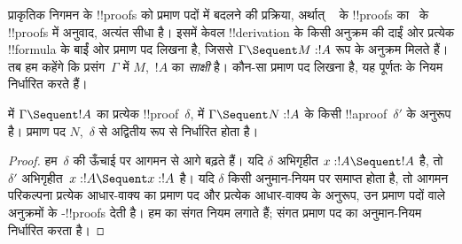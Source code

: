 \documentclass[../../../include/open-logic-section]{subfiles}
\begin{document}


प्राकृतिक निगमन के !!{proof}s को प्रमाण पदों में बदलने की प्रक्रिया, अर्थात्
~ के !!{proof}s का~ के !!{proof}s में अनुवाद, अत्यंत सीधा
है। इसमें केवल !!{derivation} के किसी अनुक्रम की दाईं ओर प्रत्येक !!{formula}
के बाईं ओर प्रमाण पद लिखना है, जिससे $\Gamma \Sequent M : !A$ रूप के अनुक्रम
मिलते हैं। तब हम कहेंगे कि प्रसंग~$\Gamma$ में $M$,~$!A$ का \emph{साक्षी} है।
कौन-सा प्रमाण पद लिखना है, यह पूर्णतः  के नियम निर्धारित करते हैं।

\begin{prop}
 में $\Gamma \Sequent !A$ का प्रत्येक !!{proof}~$\delta$,
 में $\Gamma \Sequent N : !A$ के किसी !!a{proof}~$\delta'$ के अनुरूप
है। प्रमाण पद $N$,~$\delta$ से अद्वितीय रूप से निर्धारित होता है।
\end{prop}

\begin{proof}
हम~$\delta$ की ऊँचाई पर आगमन से आगे बढ़ते हैं। यदि $\delta$ अभिगृहीत $x:!A
\Sequent !A$ है, तो $\delta'$ अभिगृहीत~$x:!A \Sequent x:!A$ है। यदि $\delta$
किसी अनुमान-नियम पर समाप्त होता है, तो आगमन परिकल्पना प्रत्येक आधार-वाक्य का
प्रमाण पद और प्रत्येक आधार-वाक्य के अनुरूप, उन प्रमाण पदों वाले अनुक्रमों के
-!!{proof}s देती है। हम  का संगत नियम लगाते हैं; संगत
प्रमाण पद  का अनुमान-नियम निर्धारित करता है।
\end{proof}
\end{document}
